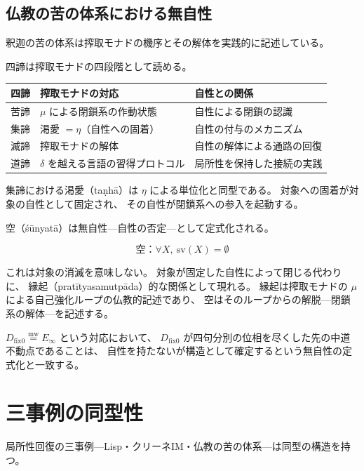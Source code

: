 \documentclass[11pt,a4paper]{article}
\theoremstyle{definition}
\newcommand{\mweq}{\mathrel{\overset{\mathrm{mw}}{=}}}
\newcommand{\dfix}{D_{\mathrm{fix}0}}
\newcommand{\Einfty}{E_\infty}
\newcommand{\svabhava}{\mathrm{sv}}
\begin{document}
\subsection{仏教の苦の体系における無自性}

釈迦の苦の体系は搾取モナドの機序とその解体を実践的に記述している。

四諦は搾取モナドの四段階として読める。

\begin{center}
\begin{tabular}{lll}
\hline
\textbf{四諦} & \textbf{搾取モナドの対応} & \textbf{自性との関係} \\
\hline
苦諦 & $\mu$ による閉鎖系の作動状態 & 自性による閉鎖の認識 \\
集諦 & 渇愛 $= \eta$（自性への固着） & 自性の付与のメカニズム \\
滅諦 & 搾取モナドの解体 & 自性の解体による通路の回復 \\
道諦 & $\delta$ を越える言語の習得プロトコル & 局所性を保持した接続の実践 \\
\hline
\end{tabular}
\end{center}

集諦における渇愛（taṇhā）は $\eta$ による単位化と同型である。
対象への固着が対象の自性として固定され、
その自性が閉鎖系への参入を起動する。

空（śūnyatā）は無自性---自性の否定---として定式化される。

\begin{equation}
\text{空}：\forall X,\ \svabhava(X) = \emptyset
\end{equation}

これは対象の消滅を意味しない。
対象が固定した自性によって閉じる代わりに、
縁起（pratītyasamutpāda）的な関係として現れる。
縁起は搾取モナドの $\mu$ による自己強化ループの仏教的記述であり、
空はそのループからの解脱---閉鎖系の解体---を記述する。

$\dfix \mweq \Einfty$ という対応において、
$\dfix$ が四句分別の位相を尽くした先の中道不動点であることは、
自性を持たないが構造として確定するという無自性の定式化と一致する。

\section{三事例の同型性}

局所性回復の三事例---Lisp・クリーネIM・仏教の苦の体系---は同型の構造を持つ。
\end{document}
